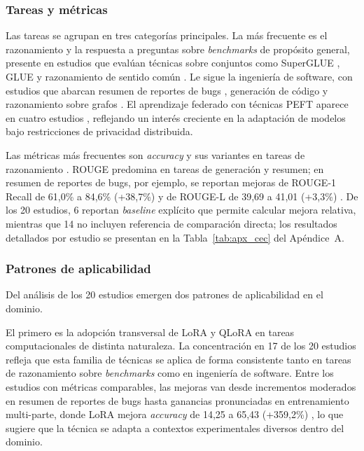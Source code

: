 \subsubsection{Tareas y métricas}

Las tareas se agrupan en tres categorías principales. La más frecuente es el razonamiento y la respuesta a preguntas sobre \textit{benchmarks} de propósito general, presente en estudios que evalúan técnicas sobre conjuntos como SuperGLUE \parencite{liu2025tasks}, GLUE \parencite{jung2025prefix} y razonamiento de sentido común \parencite{wang2025ft}. Le sigue la ingeniería de software, con estudios que abarcan resumen de reportes de bugs \parencite{xiang2024sumllama, choi2025agentreport}, generación de código \parencite{ulurmak2025ft} y razonamiento sobre grafos \parencite{chen2025glr}. El aprendizaje federado con técnicas PEFT aparece en cuatro estudios \parencite{elbakary2025mira, li2025federated, liu2025federated, iftikhar2025peft}, reflejando un interés creciente en la adaptación de modelos bajo restricciones de privacidad distribuida.

Las métricas más frecuentes son \textit{accuracy} y sus variantes en tareas de razonamiento \parencite{liu2025tasks, iftikhar2025peft}. ROUGE predomina en tareas de generación y resumen; en resumen de reportes de bugs, por ejemplo, se reportan mejoras de ROUGE-1 Recall de 61,0\% a 84,6\% (+38,7\%) \parencite{choi2025agentreport} y de ROUGE-L de 39,69 a 41,01 (+3,3\%) \parencite{xiang2024sumllama}. De los 20 estudios, 6 reportan \textit{baseline} explícito que permite calcular mejora relativa, mientras que 14 no incluyen referencia de comparación directa; los resultados detallados por estudio se presentan en la Tabla~\ref{tab:apx_cec} del Apéndice~A.

\subsubsection{Patrones de aplicabilidad}

Del análisis de los 20 estudios emergen dos patrones de aplicabilidad en el dominio.

El primero es la adopción transversal de LoRA y QLoRA en tareas computacionales de distinta naturaleza. La concentración en 17 de los 20 estudios refleja que esta familia de técnicas se aplica de forma consistente tanto en tareas de razonamiento sobre \textit{benchmarks} como en ingeniería de software. Entre los estudios con métricas comparables, las mejoras van desde incrementos moderados en resumen de reportes de bugs \parencite{xiang2024sumllama} hasta ganancias pronunciadas en entrenamiento multi-parte, donde LoRA mejora \textit{accuracy} de 14,25 a 65,43 (+359,2\%) \parencite{liu2025mpctf}, lo que sugiere que la técnica se adapta a contextos experimentales diversos dentro del dominio.

